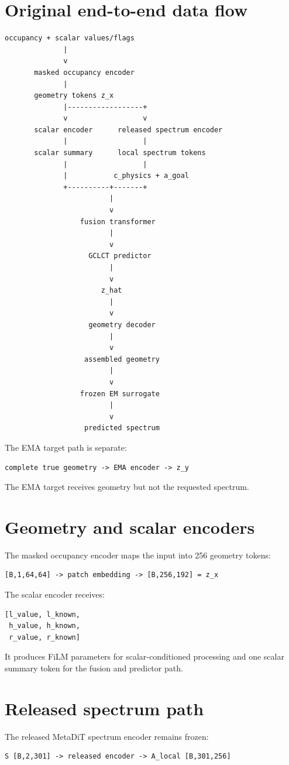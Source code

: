 \documentclass[11pt,a4paper]{article}
\begin{document}
\section{Original end-to-end data flow}
\begin{lstlisting}
occupancy + scalar values/flags
              |
              v
       masked occupancy encoder
              |
       geometry tokens z_x
              |------------------+
              v                  v
       scalar encoder      released spectrum encoder
              |                  |
       scalar summary      local spectrum tokens
              |                  |
              |           c_physics + a_goal
              +----------+-------+
                         |
                         v
                  fusion transformer
                         |
                         v
                    GCLCT predictor
                         |
                         v
                       z_hat
                         |
                         v
                    geometry decoder
                         |
                         v
                   assembled geometry
                         |
                         v
                  frozen EM surrogate
                         |
                         v
                   predicted spectrum
\end{lstlisting}
The EMA target path is separate:
\begin{lstlisting}
complete true geometry -> EMA encoder -> z_y
\end{lstlisting}
The EMA target receives geometry but not the requested spectrum.

\section{Geometry and scalar encoders}
The masked occupancy encoder maps the input into 256 geometry tokens:
\begin{lstlisting}
[B,1,64,64] -> patch embedding -> [B,256,192] = z_x
\end{lstlisting}
The scalar encoder receives:
\begin{lstlisting}
[l_value, l_known,
 h_value, h_known,
 r_value, r_known]
\end{lstlisting}
It produces FiLM parameters for scalar-conditioned processing and one scalar
summary token for the fusion and predictor path.

\section{Released spectrum path}
The released MetaDiT spectrum encoder remains frozen:
\begin{lstlisting}
S [B,2,301] -> released encoder -> A_local [B,301,256]
\end{lstlisting}
\end{document}
